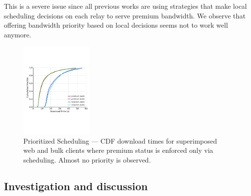 This is a severe issue since all previous works are using strategies that
make local scheduling decisions on each relay to serve premium bandwidth.
We observe that offering bandwidth priority based on local decisions seems not
to work well anymore.

\begin{figure} \centering
  \includegraphics[trim={0 3cm 0 3cm}, clip, width=0.32\textwidth]{images/scheduling_priority.pdf}
  \caption[Prioritized Scheduling]{Prioritized Scheduling --- CDF download
    times for superimposed web and bulk clients where premium status is enforced
    only via scheduling. Almost no priority is observed.}
  \label{fig:scheduling_priority}
\end{figure}

\subsection{Investigation and discussion}

